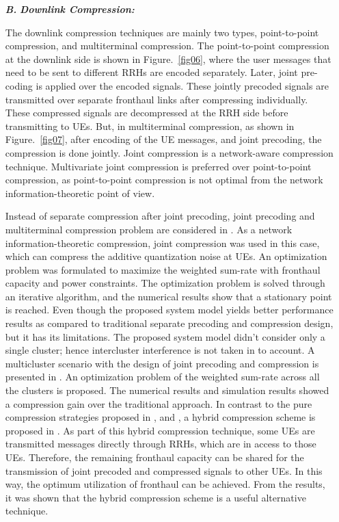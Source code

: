 \begin{multicols}{2}
\begin{itemize}

\item[{\textit{\textbf{ B.}}}] {\textit{\textbf{Downlink Compression:}}}

The downlink compression techniques are mainly two types, point-to-point compression, and multiterminal compression. The point-to-point compression at the downlink side is shown in Figure.~\ref{fig06}, where the user messages that need to be sent to different RRHs are encoded separately. Later, joint pre-coding is applied over the encoded signals. These jointly precoded signals are transmitted over separate fronthaul links after compressing individually. These compressed signals are decompressed at the RRH side before transmitting to UEs. But, in multiterminal compression, as shown in Figure.~\ref{fig07}, after encoding of the UE messages, and joint precoding, the compression is done jointly. Joint compression is a network-aware compression technique. Multivariate joint compression is preferred over point-to-point compression, as point-to-point compression is not optimal from the network information-theoretic point of view.

Instead of separate compression after joint precoding, joint precoding and multiterminal compression problem are considered in \cite{art3-key59}. As a network information-theoretic compression, joint compression was used in this case, which can compress the additive quantization noise at UEs. An optimization problem was formulated to maximize the weighted sum-rate with fronthaul capacity and power constraints. The optimization problem is solved through an iterative algorithm, and the numerical results show that a stationary point is reached. Even though the proposed system model yields better performance results as compared to traditional separate precoding and compression design, but it has its limitations. The proposed system model didn’t consider only a single cluster; hence intercluster interference is not taken in to account. A multicluster scenario with the design of joint precoding and compression is presented in \cite{art3-key60}. An optimization problem of the weighted sum-rate across all the clusters is proposed. The numerical results and simulation results showed a compression gain over the traditional approach. In contrast to the pure compression strategies proposed in \cite{art3-key59}, and \cite{art3-key60}, a hybrid compression scheme is proposed in \cite{art3-key61}. As part of this hybrid compression technique, some UEs are transmitted messages directly through RRHs, which are in access to those UEs. Therefore, the remaining fronthaul capacity can be shared for the transmission of joint precoded and compressed signals to other UEs. In this way, the optimum utilization of fronthaul can be achieved. From the results, it was shown that the hybrid compression scheme is a useful alternative technique. 


\end{itemize}
\end{multicols}
